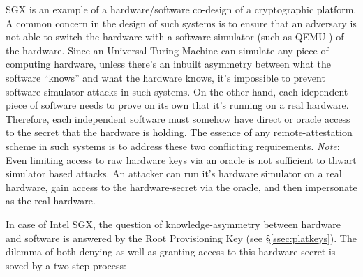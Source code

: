 \documentclass[10pt]{article}
\newcommand{\secref}[1]{\S\ref{#1}}
\begin{document}
  SGX is an example of a hardware/software co-design of a
  cryptographic platform. A common concern in the design of such
  systems is to ensure that an adversary is not able to switch the
  hardware with a software simulator (such as QEMU \cite{qemu,
    opensgx}) of the hardware. Since an Universal Turing Machine can
  simulate any piece of computing hardware, unless there's an inbuilt
  asymmetry between what the software ``knows'' and what the hardware
  knows, it's impossible to prevent software simulator attacks in such
  systems. On the other hand, each idependent piece of software needs
  to prove on its own that it's running on a real hardware.
  Therefore, each independent software must somehow have direct or
  oracle access to the secret that the hardware is holding. The
  essence of any remote-attestation scheme in such systems is to
  address these two conflicting requirements. {\em Note}: Even limiting
  access to raw hardware keys via an oracle is not sufficient to thwart
  simulator based attacks. An attacker can run it's hardware simulator
  on a real hardware, gain access to the hardware-secret via the
  oracle, and then impersonate as the real hardware.

  In case of Intel SGX, the question of knowledge-asymmetry between
  hardware and software is answered by the Root Provisioning Key (see
  \secref{ssec:platkeys}). The dilemma of both denying as well as
  granting access to this hardware secret is soved by a two-step
  process:  
\end{document}
